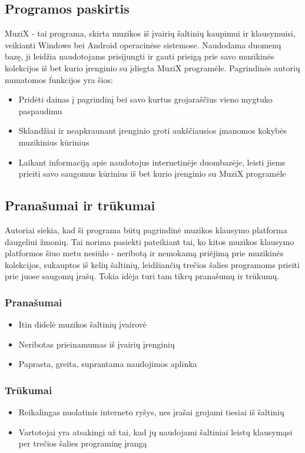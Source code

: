 \documentclass{VUMIFPSkursinis}
\begin{document}
\subsection{Programos paskirtis}
MuziX - tai programa, skirta muzikos iš įvairių šaltinių kaupimui ir klausymuisi, veikianti Windows bei Android operacinėse sistemose. Naudodama duomenų bazę, ji leidžia naudotojams prisijungti ir gauti prieigą prie savo muzikinės kolekcijos iš bet kurio įrenginio su įdiegta MuziX programėle. Pagrindinės autorių numatomos funkcijos yra šios:
\begin{itemize}
	\item Pridėti dainas į pagrindinį bei savo kurtus grojaraščius vieno mygtuko paspaudimu
	\item Sklandžiai ir neapkraunant įrenginio groti aukščiausios įmanomos kokybės muzikinius kūrinius
	\item Laikant informaciją apie naudotojus internetinėje duombazėje, leisti jiems prieiti savo saugomus kūrinius iš bet kurio įrenginio su MuziX programėle
\end{itemize}

\subsection{Pranašumai ir trūkumai}
Autoriai siekia, kad ši programa būtų pagrindinė muzikos klausymo platforma daugeliui žmonių. Tai norima pasiekti pateikiant tai, ko kitos muzikos klausymo platformos šiuo metu nesiūlo - neribotą ir nemokamą priėjimą prie muzikinės kolekcijos, sukauptos iš kelių šaltinių, leidžiančių trečios šalies programoms prieiti prie juose saugomų įrašų. Tokia idėja turi tam tikrų pranašumų ir trūkumų.
\subsubsection{Pranašumai}
\begin{itemize}
	\item Itin didelė muzikos šaltinių įvairovė
	\item Neribotas prieinamumas iš įvairių įrenginių
	\item Paprasta, greita, suprantama naudojimos aplinka
\end{itemize}
\subsubsection{Trūkumai}
\begin{itemize}
	\item Reikalingas nuolatinis interneto ryšys, nes įrašai grojami tiesiai iš šaltinių
	\item Vartotojai yra atsakingi už tai, kad jų naudojami šaltiniai leistų klausymąsi per trečios šalies programinę įrangą
\end{itemize}
\end{document}
